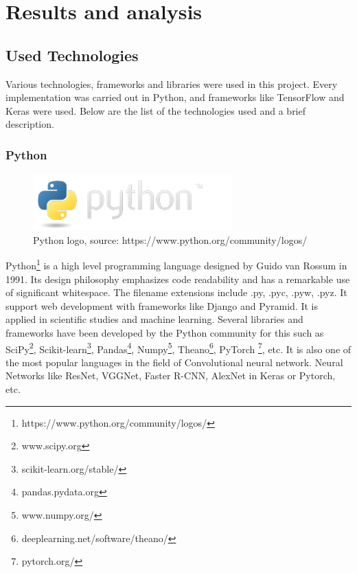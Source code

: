 \chapter{Results and analysis}\label{ch:Results}


\section{Used Technologies}
Various technologies, frameworks and libraries were used in this project. Every implementation was carried out in Python, and frameworks like TensorFlow and Keras were used. Below are the list of the technologies used and a brief description.

\subsection{Python}

\begin{figure}[H]
    \centering
    \includegraphics[width=0.8\linewidth]{images/python-logo.png}
     \caption{Python logo, source: https://www.python.org/community/logos/}
  \end{figure}

Python\footnote{https://www.python.org/community/logos/} is a high level programming language designed by Guido van Rossum in 1991. Its design philosophy emphasizes code readability and has a remarkable use of significant whitespace. The filename extensions include .py, .pyc, .pyw, .pyz. It support web development with frameworks like Django and Pyramid. It is applied in scientific studies and machine learning. Several libraries and frameworks have been developed by the Python community for this such as 
SciPy\footnote{www.scipy.org}, Scikit-learn\footnote{scikit-learn.org/stable/}, Pandas\footnote{pandas.pydata.org}, Numpy\footnote{www.numpy.org/}, Theano\footnote{deeplearning.net/software/theano/}, PyTorch \footnote{pytorch.org/}, etc. It is also one of the most popular languages in the field of Convolutional neural network. Neural Networks like ResNet, VGGNet, Faster R-CNN, AlexNet in Keras or Pytorch, etc. 

